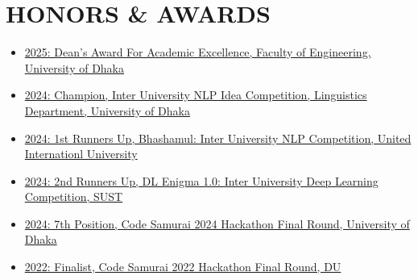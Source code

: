\documentclass[letterpaper,11pt]{article}
\begin{document}
\section{HONORS \& AWARDS}
\begin{itemize}[leftmargin=0.15in]
    \small
    \item \href{https://www.linkedin.com/posts/abdullaharean_areans-deans-award-invitation-activity-7388431943425634304--Csq?utm_source=share&utm_medium=member_desktop&rcm=ACoAADA0SqcBFs_96NpHtIVeS5AoqAZzWIEeQ28}{2025: Dean's Award For Academic Excellence, Faculty of Engineering, University of Dhaka}
    \item \href{https://www.linkedin.com/posts/abdullaharean_duabrbayanno-naturallanguageprocessing-bengaliheritage-activity-7169360072488239127-G48N?utm_source=social_share_send&utm_medium=member_desktop_web&rcm=ACoAADA0SqcBFs_96NpHtIVeS5AoqAZzWIEeQ28}{2024: Champion, Inter University NLP Idea Competition, Linguistics Department, University of Dhaka}
    \item \href{https://www.linkedin.com/posts/abdullaharean_i-am-glad-to-announce-that-my-team-teamkhitakortesi-activity-7173172405664698368-Xx_m?utm_source=social_share_send&utm_medium=member_desktop_web&rcm=ACoAADA0SqcBFs_96NpHtIVeS5AoqAZzWIEeQ28}{2024: 1st Runners Up, Bhashamul: Inter University NLP Competition, United Internationl University}
    \item \href{https://www.linkedin.com/posts/abdullaharean_i-am-thrilled-to-announce-that-our-team-activity-7166064837989462017-Hi8E?utm_source=social_share_send&utm_medium=member_desktop_web&rcm=ACoAADA0SqcBFs_96NpHtIVeS5AoqAZzWIEeQ28}{2024: 2nd Runners Up, DL Enigma 1.0: Inter University Deep Learning Competition, SUST}
    \item \href{https://www.linkedin.com/posts/abdullaharean_codesamuraibd-hackathon-innovation-activity-7196073001052749825-R3Yc?utm_source=social_share_send&utm_medium=member_desktop_web&rcm=ACoAADA0SqcBFs_96NpHtIVeS5AoqAZzWIEeQ28}{2024: 7th Position, Code Samurai 2024 Hackathon Final Round, University of Dhaka}
    \item \href{https://www.linkedin.com/posts/abdullaharean_participated-in-code-samurai-2022-final-round-activity-7015198888487780352-T0I_?utm_source=social_share_send&utm_medium=member_desktop_web&rcm=ACoAADA0SqcBFs_96NpHtIVeS5AoqAZzWIEeQ28}{2022: Finalist, Code Samurai 2022 Hackathon Final Round, DU}

\end{itemize}
\end{document}
